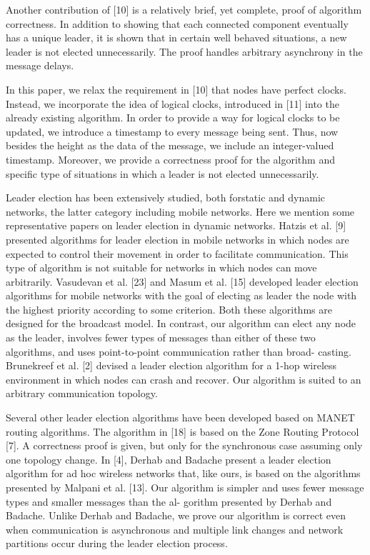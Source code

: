 Another contribution of [10] is a relatively brief, yet complete, proof of algorithm correctness. In addition to showing that each connected component eventually has a unique leader, it is shown that in certain well behaved situations, a new leader is not elected unnecessarily. The proof handles arbitrary asynchrony in the message delays.

In this paper, we relax the requirement in [10] that nodes have perfect clocks. Instead, we incorporate the idea of logical clocks, introduced in [11] into the already existing algorithm. In order to provide a way for logical clocks to be updated, we introduce a timestamp to every message being sent. Thus, now besides the height as the data of the message, we include an integer-valued timestamp. Moreover, we provide a correctness proof for the algorithm and specific type of situations in which a leader is not elected unnecessarily.

Leader election has been extensively studied, both forstatic and dynamic networks, the latter category including mobile networks. Here we mention some representative papers on leader election in dynamic networks. Hatzis et al. [9] presented algorithms for leader election in mobile networks in which nodes are expected to control their movement in order to facilitate communication. This type of algorithm is not suitable for networks in which nodes can move arbitrarily. Vasudevan et al. [23] and Masum et al. [15] developed leader election algorithms for mobile networks with the goal of electing as leader the node with the highest priority according to some criterion. Both these algorithms are designed for the broadcast model. In contrast, our algorithm can elect any node as the leader, involves fewer types of messages than either of these two algorithms, and uses point-to-point communication rather than broad- casting. Brunekreef et al. [2] devised a leader election algorithm for a 1-hop wireless environment in which nodes can crash and recover. Our algorithm is suited to an arbitrary communication topology.

Several other leader election algorithms have been developed based on MANET routing algorithms. The algorithm in [18] is based on the Zone Routing Protocol [7]. A correctness proof is given, but only for the synchronous case assuming only one topology change. In [4], Derhab and Badache present a leader election algorithm for ad hoc wireless networks that, like ours, is based on the algorithms presented by Malpani et al. [13]. Our algorithm is simpler and uses fewer message types and smaller messages than the al- gorithm presented by Derhab and Badache. Unlike Derhab and Badache, we prove our algorithm is correct even when communication is asynchronous and multiple link changes and network partitions occur during the leader election process.

